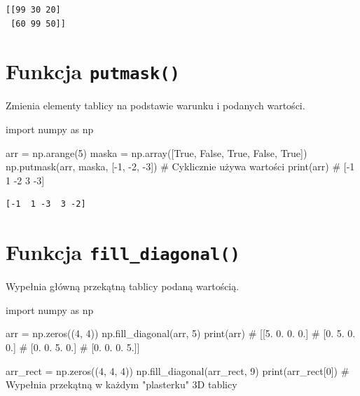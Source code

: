 \documentclass[
  polish,
  letterpaper,
  DIV=11,
  numbers=noendperiod]{scrreprt}
\newenvironment{Shaded}{\begin{snugshade}}{\end{snugshade}}
\newcommand{\BuiltInTok}[1]{\textcolor[rgb]{0.00,0.23,0.31}{#1}}
\newcommand{\CommentTok}[1]{\textcolor[rgb]{0.37,0.37,0.37}{#1}}
\newcommand{\DecValTok}[1]{\textcolor[rgb]{0.68,0.00,0.00}{#1}}
\newcommand{\ImportTok}[1]{\textcolor[rgb]{0.00,0.46,0.62}{#1}}
\newcommand{\NormalTok}[1]{\textcolor[rgb]{0.00,0.23,0.31}{#1}}
\newcommand{\OperatorTok}[1]{\textcolor[rgb]{0.37,0.37,0.37}{#1}}
\newcommand{\VariableTok}[1]{\textcolor[rgb]{0.07,0.07,0.07}{#1}}
\begin{document}
\begin{verbatim}
[[99 30 20]
 [60 99 50]]
\end{verbatim}

\section{\texorpdfstring{Funkcja
\texttt{putmask()}}{Funkcja putmask()}}\label{funkcja-putmask}

Zmienia elementy tablicy na podstawie warunku i podanych wartości.

\begin{Shaded}
\begin{Highlighting}[]
\ImportTok{import}\NormalTok{ numpy }\ImportTok{as}\NormalTok{ np}

\NormalTok{arr }\OperatorTok{=}\NormalTok{ np.arange(}\DecValTok{5}\NormalTok{)}
\NormalTok{maska }\OperatorTok{=}\NormalTok{ np.array([}\VariableTok{True}\NormalTok{, }\VariableTok{False}\NormalTok{, }\VariableTok{True}\NormalTok{, }\VariableTok{False}\NormalTok{, }\VariableTok{True}\NormalTok{])}
\NormalTok{np.putmask(arr, maska, [}\OperatorTok{{-}}\DecValTok{1}\NormalTok{, }\OperatorTok{{-}}\DecValTok{2}\NormalTok{, }\OperatorTok{{-}}\DecValTok{3}\NormalTok{])  }\CommentTok{\# Cyklicznie używa wartości}
\BuiltInTok{print}\NormalTok{(arr)  }\CommentTok{\# [{-}1  1 {-}2  3 {-}3]}
\end{Highlighting}
\end{Shaded}

\begin{verbatim}
[-1  1 -3  3 -2]
\end{verbatim}

\section{\texorpdfstring{Funkcja
\texttt{fill\_diagonal()}}{Funkcja fill\_diagonal()}}\label{funkcja-fill_diagonal}

Wypełnia główną przekątną tablicy podaną wartością.

\begin{Shaded}
\begin{Highlighting}[]
\ImportTok{import}\NormalTok{ numpy }\ImportTok{as}\NormalTok{ np}

\NormalTok{arr }\OperatorTok{=}\NormalTok{ np.zeros((}\DecValTok{4}\NormalTok{, }\DecValTok{4}\NormalTok{))}
\NormalTok{np.fill\_diagonal(arr, }\DecValTok{5}\NormalTok{)}
\BuiltInTok{print}\NormalTok{(arr)}
\CommentTok{\# [[5. 0. 0. 0.]}
\CommentTok{\#  [0. 5. 0. 0.]}
\CommentTok{\#  [0. 0. 5. 0.]}
\CommentTok{\#  [0. 0. 0. 5.]]}

\NormalTok{arr\_rect }\OperatorTok{=}\NormalTok{ np.zeros((}\DecValTok{4}\NormalTok{, }\DecValTok{4}\NormalTok{, }\DecValTok{4}\NormalTok{))}
\NormalTok{np.fill\_diagonal(arr\_rect, }\DecValTok{9}\NormalTok{)}
\BuiltInTok{print}\NormalTok{(arr\_rect[}\DecValTok{0}\NormalTok{])  }\CommentTok{\# Wypełnia przekątną w każdym "plasterku" 3D tablicy}
\end{Highlighting}
\end{Shaded}
\end{document}

